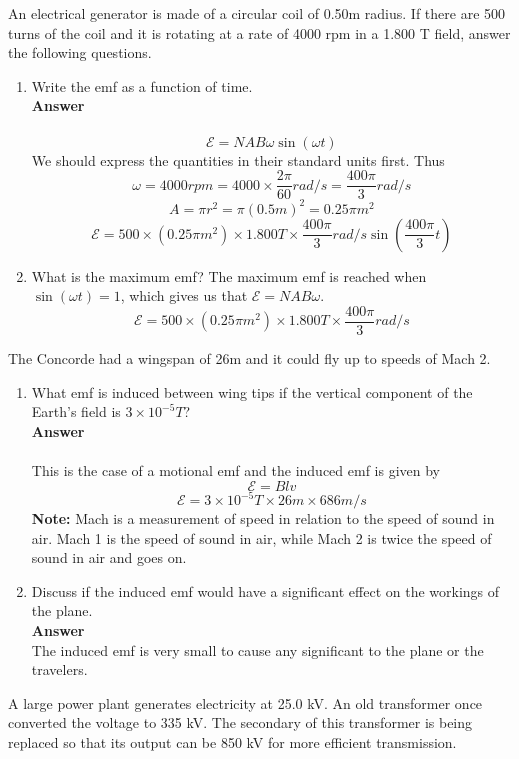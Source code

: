 \documentclass[11pt,addpoints]{exam}
\begin{document}
	\begin{questions}
		\question An electrical generator is made of a circular coil of 0.50m radius. If there are 500 turns of the coil and it is rotating at a rate of 4000 rpm in a 1.800 T field, answer the following questions.
		\begin{enumerate}[label=(\alph*)]
			\item Write the emf as a function of time. \\ \textbf{Answer} \\ \\
			$$\mathcal{E}=NAB\omega\sin(\omega t)$$
			We should express the quantities in their standard units first. Thus
			$$\omega= 4000 rpm = 4000 \times \dfrac{2\pi}{60}rad/s=\dfrac{400\pi}{3}rad/s$$
			$$A=\pi r^2=\pi(0.5m)^2=0.25\pi m^2$$
			$$\mathcal{E}=500\times(0.25\pi m^2)\times1.800T\times\dfrac{400\pi}{3}rad/s\sin(\dfrac{400\pi}{3}t)$$
			\item What is the maximum emf?
			The maximum emf is reached when $\sin(\omega t)=1$, which gives us that $\mathcal{E}=NAB\omega$.
			$$\mathcal{E}=500\times(0.25\pi m^2)\times1.800T\times\dfrac{400\pi}{3}rad/s$$
		\end{enumerate}
		\question The Concorde had a wingspan of 26m and it could fly up to speeds of Mach 2. 
		\begin{enumerate}[label=(\alph*)]
			\item What emf is induced between wing tips if the vertical component of the Earth’s field is $3\times10^{-5}T$?
			\\ \textbf{Answer} \\ \\
			This is the case of a motional emf and the induced emf is given by
			$$\mathcal{E}=Blv$$
			$$\mathcal{E}=3\times10^{-5}T\times26m\times686m/s$$
			\textbf{Note:} Mach is a measurement of speed in relation to the speed of sound in air. Mach 1 is the speed of sound in air, while Mach 2 is twice the speed of sound in air and goes on. 
			\item Discuss if the induced emf would have a significant effect on the workings of the plane. \\ \textbf{Answer} \\
			The induced emf is very small to cause any significant to the plane or the travelers.
		\end{enumerate}
		\question A large power plant generates electricity at 25.0 kV. An old transformer once converted the voltage to 335 kV. The secondary of this transformer is being replaced so that its output can be 850 kV for more efficient transmission.

\end{questions}
\end{document}
